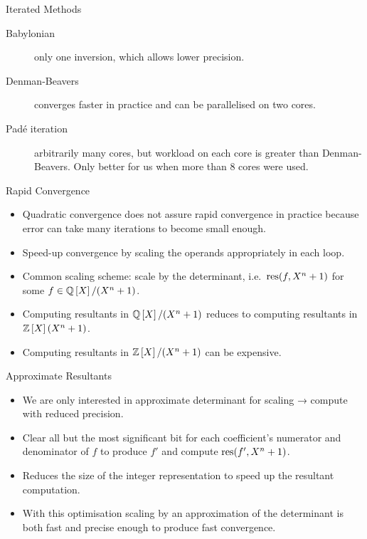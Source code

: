 \documentclass[presentation,smaller]{beamer}
\begin{document}
\begin{frame}[label={sec:orgheadline55}]{Iterated Methods}
\begin{description}
\item[{Babylonian}] only one inversion, which allows lower precision.
\item[{Denman-Beavers}] converges faster in practice and can be parallelised on two cores.
\item[{Padé iteration}] arbitrarily many cores, but workload on each core is greater than Denman-Beavers. Only better for us when more than 8 cores were used.
\end{description}
\end{frame}

\begin{frame}[label={sec:orgheadline56}]{Rapid Convergence}
\begin{itemize}
\item Quadratic convergence does not assure rapid convergence in practice because error can take many iterations to become small enough.
\item Speed-up convergence by scaling the operands appropriately in each loop.
\item Common scaling scheme: scale by the determinant, i.e. \(\operatorname{res}(f,X^n+1)\) for some \(f \in \Q[X]/(\cycf)\).
\item Computing resultants in \(\Q[X]/(\cycf)\) reduces to computing resultants in \(\Z[X](\cycf)\).
\item Computing resultants in \(\Z[X]/(\cycf)\) can be expensive.
\end{itemize}
\end{frame}

\begin{frame}[label={sec:orgheadline57}]{Approximate Resultants}
\begin{itemize}
\item We are only interested in approximate determinant for scaling → compute with reduced precision.
\item Clear all but the most significant bit for each coefficient's numerator and denominator of \(f\) to produce \(f'\) and compute \(\operatorname{res}(f',X^n+1)\).
\item Reduces the size of the integer representation to speed up the resultant computation.
\item With this optimisation scaling by an approximation of the determinant is both fast and precise enough to produce fast convergence.
\end{itemize}
\end{frame}
\end{document}
